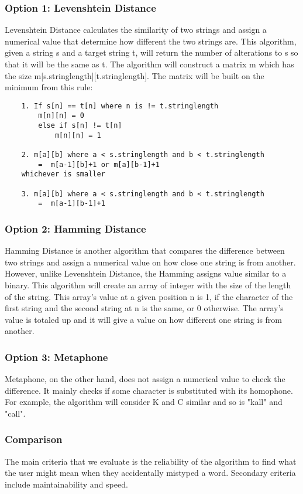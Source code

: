 \documentclass[journal,compsoc, 10pt, draftclsnofoot, onecolumn]{IEEEtran}
\begin{document}
\subsubsection*{Option 1: Levenshtein Distance}
Levenshtein Distance calculates the similarity of two strings and assign a numerical
value that determine how different the two strings are. This algorithm, given a
string s and a target string t, will return the number of alterations to s so that it
will be the same as t. The algorithm will construct a matrix m which has the size
m[s.stringlength][t.stringlength]. The matrix will be built on the minimum from this
rule:

\begin{lstlisting}
	1. If s[n] == t[n] where n is != t.stringlength 
		m[n][n] = 0 
		else if s[n] != t[n] 
			m[n][n] = 1
	
	2. m[a][b] where a < s.stringlength and b < t.stringlength 
		=  m[a-1][b]+1 or m[a][b-1]+1 
	whichever is smaller
	
	3. m[a][b] where a < s.stringlength and b < t.stringlength 
		=  m[a-1][b-1]+1
\end{lstlisting}

\subsubsection*{Option 2: Hamming Distance}
Hamming Distance is another algorithm that compares the difference between two
strings and assign a numerical value on how close one string is from another.
However, unlike Levenshtein Distance, the Hamming assigns value similar to a binary.
This algorithm will create an array of integer with the size of the length of the
string. This array's value at a given position n is 1, if the character of the first
string and the second string at n is the same, or 0 otherwise. The array's value is
totaled up and it will give a value on how different one string is from another.

\subsubsection*{Option 3: Metaphone}
Metaphone, on the other hand, does not assign a numerical value to check the
difference. It mainly checks if some character is substituted with its homophone. For
example, the algorithm will consider K and C similar and so is "kall" and "call".

\subsubsection{Comparison}
The main criteria that we evaluate is the reliability of the algorithm to find what
the user might mean when they accidentally mistyped a word. Secondary criteria
include maintainability and speed.
\end{document}
